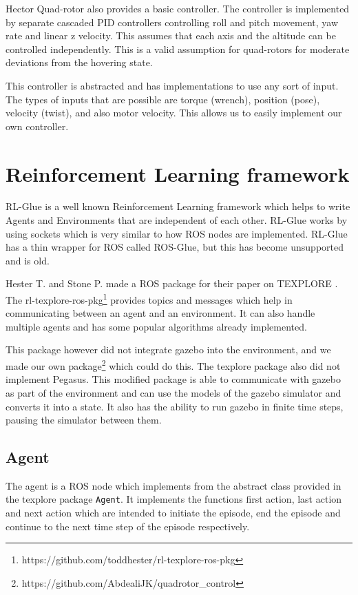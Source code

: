 \documentclass[BTech]{iitmdiss}
\begin{document}
Hector Quad-rotor also provides a basic controller. The controller is implemented by separate cascaded PID controllers controlling roll and pitch movement, yaw rate and linear z velocity. This assumes that each axis and the altitude can be controlled independently. This is a valid assumption for quad-rotors for moderate deviations from the hovering state.

This controller is abstracted and has implementations to use any sort of input. The types of inputs that are possible are torque (wrench), position (pose), velocity (twist), and also motor velocity. This allows us to easily implement our own controller.

\section{Reinforcement Learning framework}

RL-Glue \cite{RLGlue} is a well known Reinforcement Learning framework which helps to write Agents and Environments that are independent of each other. RL-Glue works by using sockets which is very similar to how ROS nodes are implemented. RL-Glue has a thin wrapper for ROS called ROS-Glue, but this has become unsupported and is old.

Hester T. and Stone P. made a ROS package for their paper on TEXPLORE \cite{Texplore}. The rl-texplore-ros-pkg\footnote{https://github.com/toddhester/rl-texplore-ros-pkg} provides topics and messages which help in communicating between an agent and an environment. It can also handle multiple agents and has some popular algorithms already implemented.

This package however did not integrate gazebo into the environment, and we made our own package\footnote{https://github.com/AbdealiJK/quadrotor\_control} which could do this. The texplore package also did not implement Pegasus. This modified package is able to communicate with gazebo as part of the environment and can use the models of the gazebo simulator and converts it into a state. It also has the ability to run gazebo in finite time steps, pausing the simulator between them.

\subsection*{Agent}

The agent is a ROS node which implements from the abstract class provided in the texplore package \texttt{Agent}. It implements the functions first action, last action and next action which are intended to initiate the episode, end the episode and continue to the next time step of the episode respectively.
\end{document}
